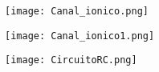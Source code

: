 \documentclass[]{article}
\begin{document}
\texttt{[image: Canal\_ionico.png]}

\texttt{[image: Canal\_ionico1.png]}

\texttt{[image: CircuitoRC.png]}
\end{document}
